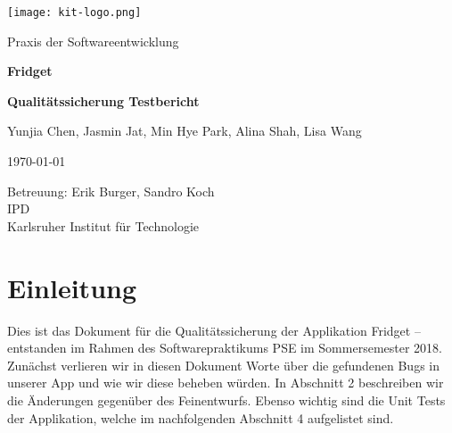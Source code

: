 \documentclass[a4paper]{scrreprt}
\begin{document}
	
	\begin{flushright}
		\texttt{[image: kit-logo.png]}\\[0.5cm]
	\end{flushright}
	\vspace*{2cm}
	
	\begin{center}
		\large Praxis der Softwareentwicklung
		\vspace*{1.5cm}
		
		\textbf{\huge Fridget}
		\vspace*{1cm}
		
		\textbf{\Large Qualitätssicherung Testbericht}
		\vspace*{2cm}
		
		Yunjia Chen, Jasmin Jat, Min Hye Park, Alina Shah, Lisa Wang
		\vspace*{1cm}
		
		\today
		\vspace*{2.5cm}
		
		Betreuung: Erik Burger, Sandro Koch\\[0.5cm]
		IPD\\[0.5cm]
		
		Karlsruher Institut für Technologie
		
	\end{center}

	\thispagestyle{empty}
	
	\tableofcontents
	
	\chapter{Einleitung}
	Dies ist das Dokument für die Qualitätssicherung der Applikation Fridget – entstanden im Rahmen
	des Softwarepraktikums PSE im Sommersemester 2018.
	Zunächst verlieren wir in diesen Dokument Worte über die gefundenen Bugs in unserer App und wie wir diese beheben würden.
	In Abschnitt 2 beschreiben wir die Änderungen gegenüber des Feinentwurfs.
	Ebenso wichtig sind die Unit Tests der Applikation, welche im nachfolgenden Abschnitt 4 aufgelistet sind.
	
\end{document}
